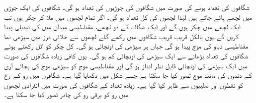 شگافوں کی تعداد  ہونے کی صورت میں شگافوں کی جوڑیوں کی تعداد  ہو گی۔ شگافوں کی ایک جوڑی میں  لچھے پائے جاتے ہیں لہٰذا لچھوں کی کل تعداد  ہو گی۔ اگر تمام لچھوں میں ملا کر  چکر ہوں تب ایک لچھے میں   چکر ہوں گے اور ایک شگاف کے دو لچھے،  مقناطیسی میدان میں   کی تبدیلی پیدا کریں گے۔یوں  بالکل قریب قریب شگافوں میں رکھے گئے لچھوں سے خلائی درز میں  سیڑھی نما مقناطیسی دباو کی موج پیدا ہو گی جہاں ہر سیڑھی کی اونچائی   ہو گی۔ کل چکر   کو اٹل رکھتے ہوئے شگافوں کی تعداد بڑھانے سے  ایک سیڑھی کی اونچائی کم ہو گی۔  یوں کافی زیادہ شگافوں کی صورت میں ایک سیڑھی کی اونچائی قابل نظر انداز ہو گی اور مقناطیسی موج  کو سیڑھی موج کی بجائے آری کے دندوں کی مانند موج تصور کیا جا سکتا ہے  جسے شکل   میں دکھایا گیا ہے۔  شگافوں میں رو کے رخ کو نقطوں اور صلیبوں سے ظاہر کیا گیا ہے۔ زیادہ تعداد کے شگافوں کی  صورت میں انفرادی لچھوں میں رو کو برقی رو کی چادر تصور کیا جا سکتا ہے۔
